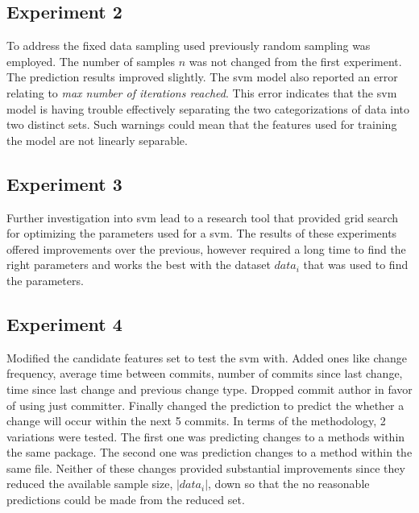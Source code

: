 \subsection{Experiment 2}

To address the fixed data sampling used previously random sampling was employed. The number of samples $n$ was not changed from the first experiment. The prediction results improved slightly. The \gls{svm} model also reported an error relating to \textit{max number of iterations reached}. This error indicates that the \gls{svm} model is having trouble effectively separating the two categorizations of data into two distinct sets. Such warnings could mean that the features used for training the model are not linearly separable.


\subsection{Experiment 3}

Further investigation into \gls{svm} lead to a research tool that provided grid search for optimizing the parameters used for a \gls{svm}. The results of these experiments offered improvements over the previous, however required a long time to find the right parameters and works the best with the dataset $data_i$ that was used to find the parameters.

\subsection{Experiment 4}

Modified the candidate features set to test the \gls{svm} with. Added ones like change frequency, average time between commits, number of commits since last change, time since last change and previous change type. Dropped commit author in favor of using just committer. Finally changed the prediction to predict the whether a change will occur within the next 5 commits. In terms of the methodology, 2 variations were tested. The first one was predicting changes to a methods within the same package. The second one was prediction changes to a method within the same file. Neither of these changes provided substantial improvements since they reduced the available sample size, $|data_i|$, down so that the no reasonable predictions could be made from the reduced set.

